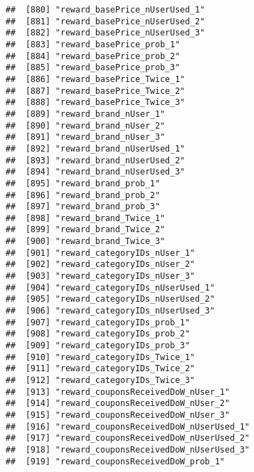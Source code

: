 \documentclass[10pt]{report}
\begin{document}
\begin{verbatim}
##  [880] "reward_basePrice_nUserUsed_1"                         
##  [881] "reward_basePrice_nUserUsed_2"                         
##  [882] "reward_basePrice_nUserUsed_3"                         
##  [883] "reward_basePrice_prob_1"                              
##  [884] "reward_basePrice_prob_2"                              
##  [885] "reward_basePrice_prob_3"                              
##  [886] "reward_basePrice_Twice_1"                             
##  [887] "reward_basePrice_Twice_2"                             
##  [888] "reward_basePrice_Twice_3"                             
##  [889] "reward_brand_nUser_1"                                 
##  [890] "reward_brand_nUser_2"                                 
##  [891] "reward_brand_nUser_3"                                 
##  [892] "reward_brand_nUserUsed_1"                             
##  [893] "reward_brand_nUserUsed_2"                             
##  [894] "reward_brand_nUserUsed_3"                             
##  [895] "reward_brand_prob_1"                                  
##  [896] "reward_brand_prob_2"                                  
##  [897] "reward_brand_prob_3"                                  
##  [898] "reward_brand_Twice_1"                                 
##  [899] "reward_brand_Twice_2"                                 
##  [900] "reward_brand_Twice_3"                                 
##  [901] "reward_categoryIDs_nUser_1"                           
##  [902] "reward_categoryIDs_nUser_2"                           
##  [903] "reward_categoryIDs_nUser_3"                           
##  [904] "reward_categoryIDs_nUserUsed_1"                       
##  [905] "reward_categoryIDs_nUserUsed_2"                       
##  [906] "reward_categoryIDs_nUserUsed_3"                       
##  [907] "reward_categoryIDs_prob_1"                            
##  [908] "reward_categoryIDs_prob_2"                            
##  [909] "reward_categoryIDs_prob_3"                            
##  [910] "reward_categoryIDs_Twice_1"                           
##  [911] "reward_categoryIDs_Twice_2"                           
##  [912] "reward_categoryIDs_Twice_3"                           
##  [913] "reward_couponsReceivedDoW_nUser_1"                    
##  [914] "reward_couponsReceivedDoW_nUser_2"                    
##  [915] "reward_couponsReceivedDoW_nUser_3"                    
##  [916] "reward_couponsReceivedDoW_nUserUsed_1"                
##  [917] "reward_couponsReceivedDoW_nUserUsed_2"                
##  [918] "reward_couponsReceivedDoW_nUserUsed_3"                
##  [919] "reward_couponsReceivedDoW_prob_1"                     

\end{verbatim}
\end{document}
